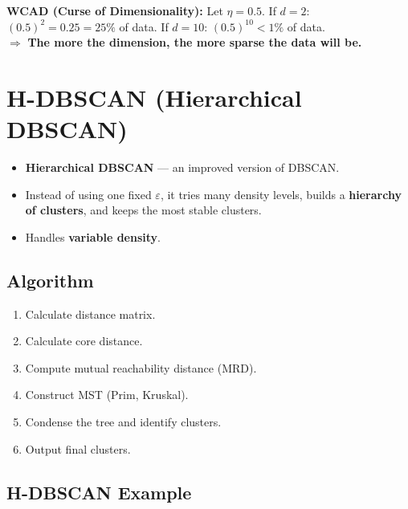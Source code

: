 \documentclass[12pt,a4paper]{article}
\begin{document}
\vspace{1em}
\begin{notebox}
\textbf{WCAD (Curse of Dimensionality):} Let $\eta = 0.5$. If $d = 2$: $(0.5)^2 = 0.25 = 25\%$ of data. If $d = 10$: $(0.5)^{10} < 1\%$ of data.\\
$\Rightarrow$ \textbf{The more the dimension, the more sparse the data will be.}
\end{notebox}

\section{H-DBSCAN (Hierarchical DBSCAN)}

\begin{definitionbox}[H-DBSCAN]
\begin{itemize}
  \item \textbf{Hierarchical DBSCAN} --- an improved version of DBSCAN.
  \item Instead of using one fixed $\varepsilon$, it tries many density levels, builds a \textbf{hierarchy of clusters}, and keeps the most stable clusters.
  \item Handles \textbf{variable density}.
\end{itemize}
\end{definitionbox}

\subsection{Algorithm}
\begin{enumerate}
  \item Calculate distance matrix.
  \item Calculate core distance.
  \item Compute mutual reachability distance (MRD).
  \item Construct MST (Prim, Kruskal).
  \item Condense the tree and identify clusters.
  \item Output final clusters.
\end{enumerate}

\subsection{H-DBSCAN Example}
\end{document}
